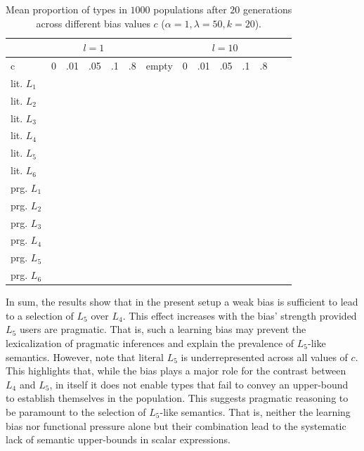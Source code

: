 \documentclass[a4paper]{article}
\begin{document}
\begin{table}
\centering 
\begin{tabular}{l c c c c c c c c c c c c c}
~ & \multicolumn{5}{c}{$l = 1$} & ~ & \multicolumn{5}{c}{$l = 10$}\\ \hline \hline
c  & 0 & .01 & .05 & .1 & .8 & empty & 0 & .01 & .05 & .1 & .8\\ \hline \hline
lit. $L_1$& ~ & ~ & ~ & ~  & ~& ~ & ~& ~ & ~ & ~ & ~\\ 
lit. $L_2$ & ~ & ~ & ~ & ~ & ~& ~ & ~& ~ & ~ & ~ & ~\\
lit. $L_3$ & ~ & ~ & ~ & ~ & ~& ~ & ~& ~ & ~ & ~ & ~\\
lit. $L_4$ & ~ & ~ & ~ & ~ & ~& ~ & ~& ~ & ~ & ~ & ~\\
lit. $L_5$ & ~ & ~ & ~ & ~ & ~& ~ & ~& ~ & ~ & ~ & ~\\
lit. $L_6$ & ~ & ~ & ~ & ~ & ~& ~ & ~& ~ & ~ & ~ & ~\\ \hline
prg. $L_1$ & ~ & ~ & ~ & ~ & ~& ~ & ~& ~ & ~ & ~ & ~ \\
prg. $L_2$ & ~ & ~ & ~ & ~ & ~& ~ & ~& ~ & ~ & ~ & ~ \\
prg. $L_3$ & ~ & ~ & ~ & ~ & ~& ~ & ~& ~ & ~ & ~ & ~ \\ 
prg. $L_4$ & ~ & ~ & ~ & ~ & ~& ~ & ~& ~ & ~ & ~ & ~ \\
prg. $L_5$ & ~ & ~ & ~ & ~ & ~& ~ & ~& ~ & ~ & ~ & ~ \\
prg. $L_6$ & ~ & ~ & ~ & ~ & ~& ~ & ~& ~ & ~ & ~ & ~   


\end{tabular}
\caption{Mean proportion of types in $1000$ populations after $20$ generations across different bias values $c$ ($\alpha = 1, \lambda = 50, k = 20$).}

\label{tab:numeric-results}
\end{table}

In sum, the results show that in the present setup a weak bias is sufficient to lead to a selection of $L_5$ over $L_4$. This effect increases with the bias' strength provided $L_5$ users are pragmatic. That is, such a learning bias may prevent the lexicalization of pragmatic inferences and explain the prevalence of $L_5$-like semantics. However, note that literal $L_5$ is underrepresented across all values of $c$. This highlights that, while the bias plays a major role for the contrast between $L_4$ and $L_5$, in itself it does not enable types that fail to convey an upper-bound to establish themselves in the population. This suggests pragmatic reasoning to be paramount to the selection of $L_5$-like semantics. That is, neither the learning bias nor functional pressure alone but their combination lead to the systematic lack of semantic upper-bounds in scalar expressions.
\end{document}
